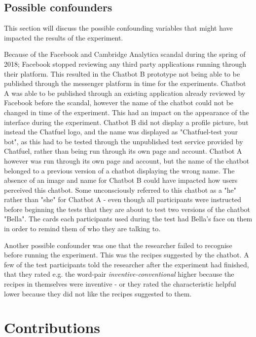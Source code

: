 \vspace{2,5mm}

\subsection{Possible confounders}
This section will discuss the possible confounding variables that might have impacted the results of the experiment.

Because of the Facebook and Cambridge Analytica scandal during the spring of 2018; Facebook stopped reviewing any third party applications running through their platform. This resulted in the Chatbot B prototype not being able to be published through the messenger platform in time for the experiments. Chatbot A was able to be published through an existing application already reviewed by Facebook before the scandal, however the name of the chatbot could not be changed in time of the experiment. This had an impact on the appearance of the interface during the experiment. Chatbot B did not display a profile picture, but instead the Chatfuel logo, and the name was displayed as "Chatfuel-test your bot", as this had to be tested through the unpublished test service provided by Chatfuel, rather than being run through its own page and account. Chatbot A however was run through its own page and account, but the name of the chatbot belonged to a previous version of a chatbot displaying the wrong name. The absence of an image and name for Chatbot B could have impacted how users perceived this chatbot. Some unconsciously referred to this chatbot as a "he" rather than "she" for Chatbot A - even though all participants were instructed before beginning the tests that they are about to test two versions of the chatbot "Bella". The cards each participants used during the test had Bella's face on them in order to remind them of who they are talking to. 

Another possible confounder was one that the researcher failed to recognise before running the experiment. This was the recipes suggested by the chatbot. A few of the test participants told the researcher after the experiment had finished, that they rated e.g. the word-pair \textit{inventive-conventional} higher because the recipes in themselves were inventive - or they rated the characteristic helpful lower because they did not like the recipes suggested to them. 
\vspace{5mm}

\section{Contributions}

